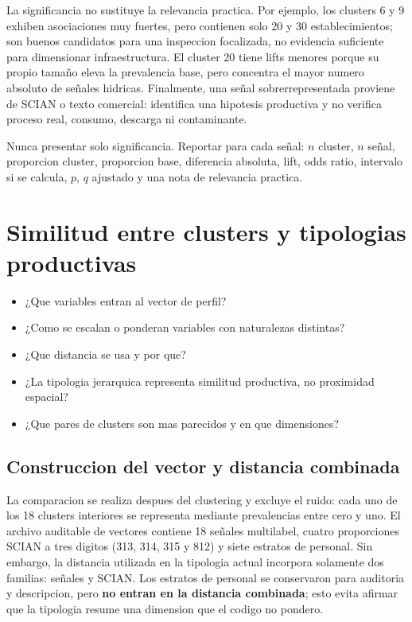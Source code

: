 \documentclass[11pt,letterpaper]{article}
\begin{document}
La significancia no sustituye la relevancia practica. Por ejemplo, los clusters 6 y 9 exhiben asociaciones muy fuertes, pero contienen solo 20 y 30 establecimientos; son buenos candidatos para una inspeccion focalizada, no evidencia suficiente para dimensionar infraestructura. El cluster 20 tiene lifts menores porque su propio tamaño eleva la prevalencia base, pero concentra el mayor numero absoluto de señales hidricas. Finalmente, una señal sobrerrepresentada proviene de SCIAN o texto comercial: identifica una hipotesis productiva y no verifica proceso real, consumo, descarga ni contaminante.

\begin{evidencia}
Nunca presentar solo significancia. Reportar para cada señal: $n$ cluster, $n$ señal, proporcion cluster, proporcion base, diferencia absoluta, lift, odds ratio, intervalo si se calcula, $p$, $q$ ajustado y una nota de relevancia practica.
\end{evidencia}

\section{Similitud entre clusters y tipologias productivas}

\begin{preguntas}
\begin{itemize}
    \item ¿Que variables entran al vector de perfil?
    \item ¿Como se escalan o ponderan variables con naturalezas distintas?
    \item ¿Que distancia se usa y por que?
    \item ¿La tipologia jerarquica representa similitud productiva, no proximidad espacial?
    \item ¿Que pares de clusters son mas parecidos y en que dimensiones?
\end{itemize}
\end{preguntas}

\subsection{Construccion del vector y distancia combinada}

La comparacion se realiza despues del clustering y excluye el ruido: cada uno de los 18 clusters interiores se representa mediante prevalencias entre cero y uno. El archivo auditable de vectores contiene 18 señales multilabel, cuatro proporciones SCIAN a tres digitos (313, 314, 315 y 812) y siete estratos de personal. Sin embargo, la distancia utilizada en la tipologia actual incorpora solamente dos familias: señales y SCIAN. Los estratos de personal se conservaron para auditoria y descripcion, pero \textbf{no entran en la distancia combinada}; esto evita afirmar que la tipologia resume una dimension que el codigo no pondero.
\end{document}
